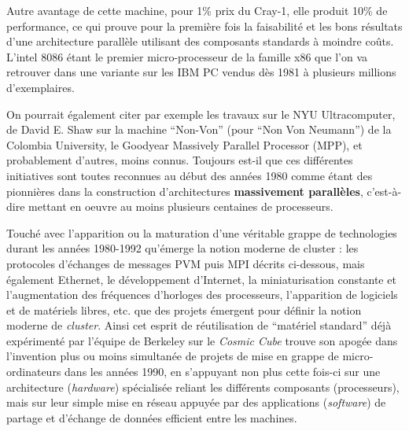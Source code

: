 Autre avantage de cette machine, pour 1\% prix du Cray-1, elle produit 10\% de performance, ce qui prouve pour la première fois la faisabilité et les bons résultats d'une architecture parallèle utilisant des composants standards à moindre coûts. L'intel 8086 étant le premier micro-processeur de la famille x86 que l'on va retrouver dans une variante sur les IBM PC vendus dès 1981 à plusieurs millions d'exemplaires. %

On pourrait également citer par exemple les travaux sur le NYU Ultracomputer, de David E. Shaw sur la machine “Non-Von” (pour “Non Von Neumann”) de la Colombia University, le Goodyear Massively Parallel Processor (MPP), et probablement d'autres, moins connus. Toujours est-il que ces différentes initiatives sont toutes reconnues au début des années 1980 comme étant des pionnières dans la construction d’architectures \textbf{massivement parallèles}, c'est-à-dire mettant en oeuvre au moins plusieurs centaines de processeurs.

Touché avec l'apparition ou la maturation d'une véritable grappe de technologies durant les années 1980-1992 qu'émerge la notion moderne de cluster : les protocoles d'échanges de messages PVM puis MPI décrits ci-dessous, mais également Ethernet, le développement d'Internet, la miniaturisation constante et l'augmentation des fréquences d'horloges des processeurs, l'apparition de logiciels et de matériels libres, etc. que des projets émergent pour définir la notion moderne de \textit{cluster}. Ainsi cet esprit de réutilisation de \enquote{matériel standard} déjà expérimenté par l'équipe de Berkeley sur le \textit{Cosmic Cube} trouve son apogée dans l'invention plus ou moins simultanée de projets de mise en grappe de micro-ordinateurs dans les années 1990, en s'appuyant non plus cette fois-ci sur une architecture (\textit{hardware}) spécialisée reliant les différents composants (processeurs), mais sur leur simple mise en réseau appuyée par des applications (\textit{software}) de partage et d'échange de données efficient entre les machines.


